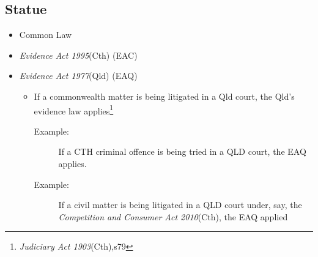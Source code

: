\subsection*{Statue}
\begin{itemize}
    \item Common Law
    \item \textit{Evidence Act 1995}(Cth) (EAC)
    \item \textit{Evidence Act 1977}(Qld) (EAQ)
        \begin{itemize}
            \item If a commonwealth matter is being litigated in a Qld court, the Qld's evidence law applies\footnote{\textit{Judiciary Act 1903}(Cth),s79}
                \begin{description}
                    \item[Example:]  If a CTH criminal offence is being tried in a QLD court, the EAQ applies.
                    \item[Example:] If a civil matter is being litigated in a QLD court under, say, the \textit{Competition and Consumer Act 2010}(Cth), the EAQ applied
                \end{description}
        \end{itemize}
\end{itemize}

